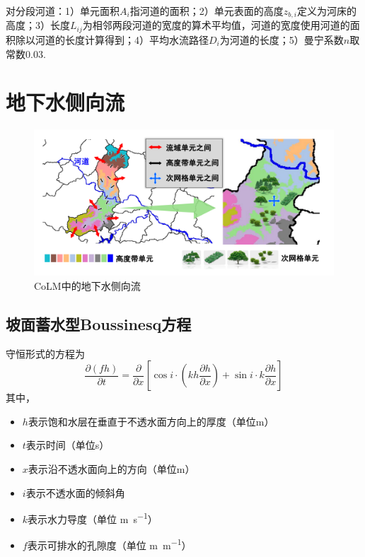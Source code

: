对分段河道：1）单元面积$A_i$指河道的面积；2）单元表面的高度$z_{b,i}$定义为河床的高度；3）长度$L_{ij}$为相邻两段河道的宽度的算术平均值，河道的宽度使用河道的面积除以河道的长度计算得到；4）平均水流路径$D_i$为河道的长度；5）曼宁系数$n$取常数$0.03$.


\section{地下水侧向流}

{
\begin{figure}[htbp]
\centering
\includegraphics[width=\textwidth]{Figures/侧向流/地下水侧向流.pdf}
\caption{CoLM中的地下水侧向流}
\label{fig:地下水侧向流}
\end{figure}
}

\subsection{坡面蓄水型Boussinesq方程}
守恒形式的方程为
\begin{equation}
\frac{\partial \left(fh\right)}{\partial t} = \frac{\partial}{\partial x} \left[\cos i \cdot \left(kh\frac{\partial h}{\partial x}\right)+\sin i\cdot k\frac{\partial h}{\partial x}\right]
\end{equation}
其中，
\begin{itemize}
\item $h$表示饱和水层在垂直于不透水面方向上的厚度（单位m）
\item $t$表示时间（单位s）
\item $x$表示沿不透水面向上的方向（单位m）
\item $i$表示不透水面的倾斜角
\item $k$表示水力导度（单位 \unit{m.s^{-1}}）
\item $f$表示可排水的孔隙度（单位 \unit{m.m^{-1}}）
\end{itemize}


